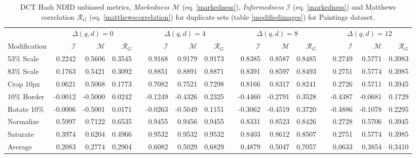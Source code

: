 \documentclass[english,12pt,a4paper,pdftex,elec,utf8, table]{aaltothesis}
\begin{document}
\begin{table}\footnotesize
\caption{ DCT Hash NDID unbiased metrics, \emph{Markedness} $\mathcal{M}$ (eq. \ref{markedness}), \emph{Informedness} $\mathcal{I}$ (eq. \ref{markedness}) and Matthews correlation $\mathcal{R}_G$ (eq. \ref{matthewscorrelation}) for duplicate sets (table \ref{modifiedimages}) for Paintings dataset. }
\label{dctunbiased}
\begin{center}
  \setlength\tabcolsep{3pt} %
  \begin{tabular}{@{}lrrrrrrrrrrrrrrr@{}}
    \toprule
    & \multicolumn{3}{c}{$\Delta(q,d) = 0$} &\phantom{abc} &\multicolumn{3}{c}{$\Delta(q,d) = 4$} &\phantom{abc} & \multicolumn{3}{c}{$\Delta(q,d)=8$} &\phantom{abc} & \multicolumn{3}{c}{$\Delta(q,d)=12$}\\
\cmidrule{2-4} \cmidrule{6-8} \cmidrule{10-12} \cmidrule{14-16}
    Modification & $\mathcal{I}$ & $\mathcal{M}$ & $\mathcal{R}_G$ &\phantom{abc} & $\mathcal{I}$ & $\mathcal{M}$ & $\mathcal{R}_G$ &\phantom{abc} & $\mathcal{I}$ & $\mathcal{M}$ & $\mathcal{R}_G$ &\phantom{abc} & $\mathcal{I}$ & $\mathcal{M}$ & $\mathcal{R}_G$\\ \midrule
    53\% Scale   & 0.2242 & 0.5606 & 0.3545 &\phantom{abc} & 0.9168 & 0.9179 & 0.9173 &\phantom{abc} & 0.8385 & 0.8587 & 0.8485  &\phantom{abc} & 0.2749 & 0.5771 & 0.3983\\
    83\% Scale   & 0.1763 & 0.5421 & 0.3092 &\phantom{abc} & 0.8851 & 0.8891 & 0.8871 &\phantom{abc} & 0.8391  & 0.8597 & 0.8493 &\phantom{abc} & 0.2751 & 0.5774 & 0.3985\\
    Crop 10px    & 0.0621 & 0.5068 & 0.1773&\phantom{abc} & 0.7082 & 0.7521 & 0.7298 &\phantom{abc} & 0.8166 & 0.8317 & 0.8241 &\phantom{abc} & 0.2726 & 0.5711 & 0.3945 \\
    10\% Border  & -0.0012 & -0.5000 & 0.0242 & \phantom{abc} & -0.1249  & -0.4326 & 0.2325 &\phantom{abc} & -0.4460 & -0.2791 & 0.3528 &\phantom{abc} & -0.4387& -0.0681 & 0.1729\\
    Rotate 10\%  & -0.0006 & -0.5001 &  0.0171 &\phantom{abc} & -0.0263 & -0.5049 & 0.1151 &\phantom{abc} & -0.3062 & -0.4519  & 0.3720 &\phantom{abc} & -0.4886 & -0.1078& 0.2295\\
    Normalize    & 0.5997 & 0.7122 & 0.6535 &\phantom{abc} & 0.9455 & 0.9456 & 0.9455 &\phantom{abc} & 0.8331 & 0.8523 & 0.8426  &\phantom{abc} & 0.2728 & 0.5706 & 0.3945\\
    Saturate     & 0.3974 & 0.6204 & 0.4966 &\phantom{abc} & 0.9532 & 0.9532 & 0.9532 &\phantom{abc} & 0.8403  & 0.8612 & 0.8507 &\phantom{abc} & 0.2751 & 0.5774 & 0.3985\\
\bottomrule
    Average      & 0,2083 & 0,2774 & 0,2904 & \phantom{abc} & \cellcolor{blue!25}0,6082 & 0,5029 & 0,6829 & \phantom{abc} & 0,4879 & 0,5047 & 0,7057 &\phantom{abc} & 0,0633& 0,3854& 0,3410\\
  \end{tabular}
\end{center}
\end{table}
\end{document}
